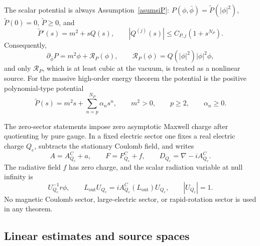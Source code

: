 \documentclass[11pt]{article}
\numberwithin{equation}{section}
\theoremstyle{plain}
\theoremstyle{definition}
\theoremstyle{remark}
\begin{document}
The scalar potential is always Assumption~\ref{asumsiP}: \(P(\phi,\bar\phi)=\widetilde P(|\phi|^2)\), \(\widetilde P(0)=0\), \(\widetilde P\ge0\), and
\begin{equation}\label{eq:app-standing-potential}
 \widetilde P'(s)=m^2+sQ(s),\qquad
 |Q^{(j)}(s)|\le C_{P,j}(1+s^{N_P}).
\end{equation}
Consequently,
\begin{equation}\label{eq:app-standing-remainder}
 \partial_{\bar\phi}P=m^2\phi+\mathcal R_P(\phi),
 \qquad
 \mathcal R_P(\phi)=Q(|\phi|^2)|\phi|^2\phi,
\end{equation}
and only \(\mathcal R_P\), which is at least cubic at the vacuum, is treated as a nonlinear source.  For the massive high-order energy theorem the potential is the positive polynomial-type potential
\begin{equation}\label{eq:app-standing-positive-potential}
 \widetilde P(s)=m^2s+\sum_{n=p}^{N_P}\alpha_n s^n,
 \qquad m^2>0,
 \qquad p\ge2,
 \qquad \alpha_n\ge0.
\end{equation}

The zero-sector statements impose zero asymptotic Maxwell charge after quotienting by pure gauge.  In a fixed electric sector one fixes a real electric charge \(Q_e\), subtracts the stationary Coulomb field, and writes
\begin{equation}\label{eq:app-standing-coulomb-split}
 A=A^C_{Q_e}+a,
 \qquad
 F=F^C_{Q_e}+f,
 \qquad
 D_{Q_e}=\nabla-iA^C_{Q_e}.
\end{equation}
The radiative field \(f\) has zero charge, and the scalar radiation variable at null infinity is
\begin{equation}\label{eq:app-standing-coulomb-radiation}
 U_{Q_e}^{-1}r\phi,
 \qquad L_{\mathrm{out}}U_{Q_e}=iA^C_{Q_e}(L_{\mathrm{out}})U_{Q_e},
 \qquad |U_{Q_e}|=1.
\end{equation}
No magnetic Coulomb sector, large-electric sector, or rapid-rotation sector is used in any theorem.

\subsection{Linear estimates and source spaces}\label{app:standing-linear-norms}
\end{document}
